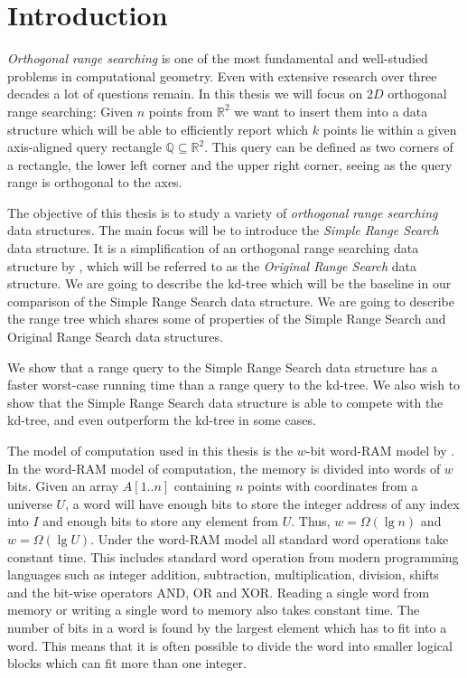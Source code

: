 \chapter{Introduction}
\label{ch:intro}

\noindent \emph{Orthogonal range searching} is one of the most fundamental and well-studied problems in computational geometry. Even with extensive research over three decades a lot of questions remain. In this thesis we will focus on $2D$ orthogonal range searching: Given $n$ points from $\mathbb{R}^2$ we want to insert them into a data structure which will be able to efficiently report which $k$ points lie within a given axis-aligned query rectangle $\mathbb{Q} \subseteq \mathbb{R}^2$. This query can be defined as two corners of a rectangle, the lower left corner and the upper right corner, seeing as the query range is orthogonal to the axes.

The objective of this thesis is to study a variety of \emph{orthogonal range searching} data structures. The main focus will be to introduce the \emph{Simple Range Search} data structure. It is a simplification of an orthogonal range searching data structure by \citet{chanetal}, which will be referred to as the \emph{Original Range Search} data structure. We are going to describe the kd-tree which will be the baseline  in our comparison of the Simple Range Search data structure. We are going to describe the range tree which shares some of properties of the Simple Range Search and Original Range Search data structures.

We show that a range query to the Simple Range Search data structure has a faster worst-case running time than a range query to the kd-tree. We also wish to show that the Simple Range Search data structure is able to compete with the kd-tree, and even outperform the kd-tree in some cases.  

The model of computation used in this thesis is the $w$-bit word-RAM model by \citet{fredman}. In the word-RAM model of computation, the memory is divided into words of $w$ bits. Given an array $A[1..n]$ containing $n$ points with coordinates from a universe $U$, a word will have enough bits to store the integer address of any index into $I$ and enough bits to store any element from $U$. Thus, $w = \Omega(\lg n)$ and $w = \Omega(\lg U)$. Under the word-RAM model all standard word operations take constant time. This includes standard word operation from modern programming languages such as integer addition, subtraction, multiplication, division, shifts and the bit-wise operators AND, OR and XOR. Reading a single word from memory or writing a single word to memory also takes constant time. The number of bits in a word is found by the largest element which has to fit into a word. This means that it is often possible to divide the word into smaller logical blocks which can fit more than one integer.  \\


